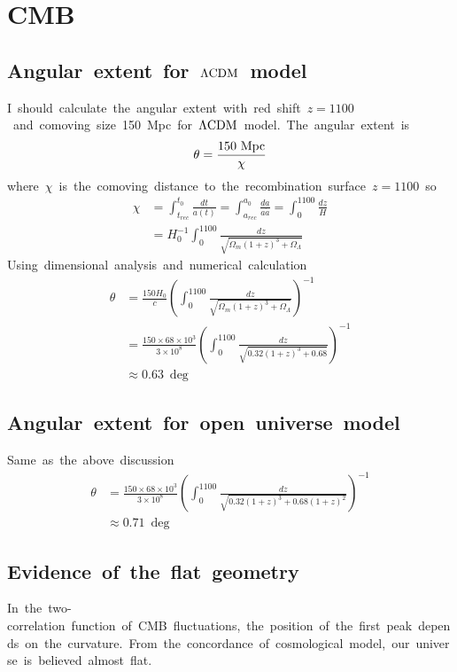 \section{CMB}
\subsection{Angular\ extent\ for\ $\Lambda\rm{CDM}$\ model}
I\ should\ calculate\ the\ angular\ extent\ with\ red\ shift\ $z=1100$\ and\ comoving\ size\ 150\ Mpc\ for\ $\Lambda\rm{CDM}$\ model.\ The\ angular\ extent\ is
\begin{align*}
    \theta=\frac{150\ \rm{Mpc}}{\chi}
\end{align*}
where\ $\chi$\ is\ the\ comoving\ distance\ to\ the\ recombination\ surface\ $z=1100$\ so
\begin{align*}
    \chi&=\int^{t_0}_{t_{rec}}\frac{dt}{a(t)}=\int^{a_0}_{a_{rec}}\frac{da}{a\Dot{a}}=\int^{1100}_0\frac{dz}{H}\\
    &=H_0^{-1}\int^{1100}_0\frac{dz}{\sqrt{\Omega_m(1+z)^3+\Omega_{\Lambda}}}
\end{align*}
Using\ dimensional\ analysis\ and\ numerical\ calculation
\begin{align}
    \theta&=\frac{150H_0}{c}\left(\int^{1100}_0\frac{dz}{\sqrt{\Omega_m(1+z)^3+\Omega_{\Lambda}}}\right)^{-1}\nonumber\\
    &=\frac{150\times68\times10^3}{3\times10^8}\left(\int^{1100}_0\frac{dz}{\sqrt{0.32(1+z)^3+0.68}}\right)^{-1}\nonumber\\
    &\approx0.63\ \deg
\end{align}
\subsection{Angular\ extent\ for\ open\ universe\ model}
Same\ as\ the\ above\ discussion
\begin{align}
    \theta&=\frac{150\times68\times10^3}{3\times10^8}\left(\int^{1100}_0\frac{dz}{\sqrt{0.32(1+z)^3+0.68(1+z)^2}}\right)^{-1}\nonumber\\
    &\approx0.71\ \deg
\end{align}
\subsection{Evidence\ of\ the\ flat\ geometry}
In\ the\ two-correlation\ function\ of\ CMB\ fluctuations,\ the\ position\ of\ the\ first\ peak\ depends\ on\ the\ curvature.\ From\ the\ concordance\ of\ cosmological\ model,\ our\ universe\ is\ believed\ almost\ flat.

